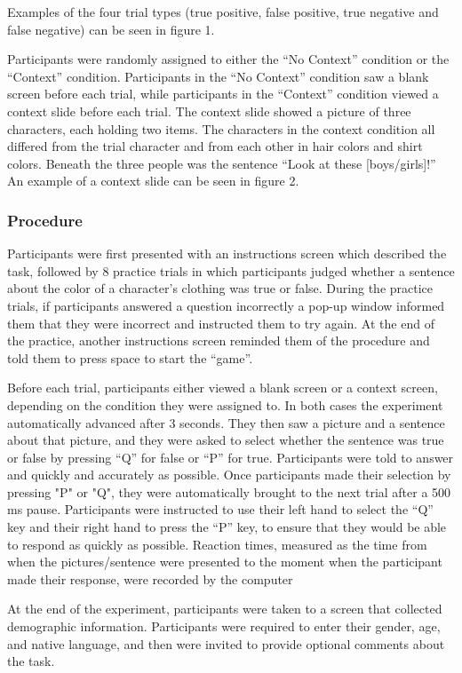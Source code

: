 \documentclass[man]{apa2}
\begin{document}
Examples of the four trial types (true positive, false positive, true negative and false negative) can be seen in figure 1.    

Participants were randomly assigned to either the ``No Context'' condition or the ``Context'' condition.  Participants in the ``No Context'' condition saw a blank screen before each trial, while participants in the ``Context'' condition viewed a context slide before each trial.  The context slide showed a picture of three characters, each holding two items.  The characters in the context condition all differed from the trial character and from each other in hair colors and shirt colors.  Beneath the three people was the sentence ``Look at these [boys/girls]!''  An example of a context slide can be seen in figure 2.  

\subsubsection{Procedure}
Participants were first presented with an instructions screen which described the task, followed by 8 practice trials in which participants judged whether a sentence about the color of a character's clothing was true or false.  During the practice trials, if participants answered a question incorrectly a pop-up window informed them that they were incorrect and instructed them to try again.  At the end of the practice, another instructions screen reminded them of the procedure and told them to press space to start the ``game''.  

Before each trial, participants either viewed a blank screen or a context screen, depending on the condition they were assigned to.  In both cases the experiment automatically advanced after 3 seconds.  They then saw a picture and a sentence about that picture, and they were asked to select whether the sentence was true or false by pressing ``Q'' for false or ``P'' for true.  Participants were told to answer and quickly and accurately as possible.  Once participants made their selection by pressing "P" or "Q", they were automatically brought to the next trial after a 500 ms pause.  Participants were instructed to use their left hand to select the ``Q'' key and their right hand to press the ``P'' key, to ensure that they would be able to respond as quickly as possible.  Reaction times, measured as the time from when the pictures/sentence were presented to the moment when the participant made their response, were recorded by the computer 

At the end of the experiment, participants were taken to a screen that collected demographic information.  Participants were required to enter their gender, age, and native language, and then were invited to provide optional comments about the task.  
\end{document}
